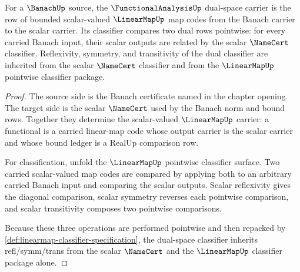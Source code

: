 \begin{theorem}
\label{thm:functionalanalysis-dual-space-classifier-obligation}
For a $\BanachUp$ source, the $\FunctionalAnalysisUp$ dual-space carrier is
the row of bounded scalar-valued $\LinearMapUp$ map codes from the Banach
carrier to the scalar carrier. Its classifier compares two dual rows
pointwise: for every carried Banach input, their scalar outputs are related by
the scalar $\NameCert$ classifier. Reflexivity, symmetry, and transitivity of
the dual classifier are inherited from the scalar $\NameCert$ classifier and
from the $\LinearMapUp$ pointwise classifier package.
\end{theorem}
\begin{proof}
The source side is the Banach certificate named in the chapter opening. The
target side is the scalar $\NameCert$ used by the Banach norm and bound rows.
Together they determine the scalar-valued $\LinearMapUp$ carrier: a functional
is a carried linear-map code whose output carrier is the scalar carrier and
whose bound ledger is a RealUp comparison row.

For classification, unfold the $\LinearMapUp$ pointwise classifier surface.
Two carried scalar-valued map codes are compared by applying both to an
arbitrary carried Banach input and comparing the scalar outputs. Scalar
reflexivity gives the diagonal comparison, scalar symmetry reverses each
pointwise comparison, and scalar transitivity composes two pointwise
comparisons.

Because these three operations are performed pointwise and then repacked by
\autoref{def:linearmap-classifier-specification}, the dual-space classifier
inherits refl/symm/trans from the scalar $\NameCert$ and the $\LinearMapUp$
classifier package alone.
\end{proof}

